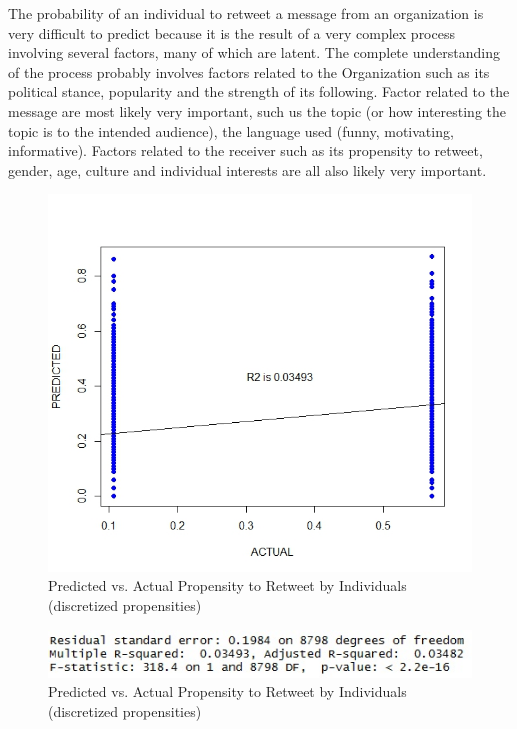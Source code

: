 The probability of an individual to retweet a message from an organization is very difficult to predict because it is the result of a very complex process involving several factors, many of which are latent.  The complete understanding of the process probably involves factors related to the Organization such as its political stance, popularity and the strength of its following.  Factor related to the message are most likely very important, such us the topic (or how interesting the topic is to the intended audience), the language used (funny, motivating, informative).  Factors related to the receiver such as its propensity to retweet, gender, age, culture and individual interests are all also likely very important.  
\begin{figure}
\includegraphics[scale=0.4]{PredictedvActual_binning}
\caption{Predicted vs. Actual Propensity to Retweet by Individuals (discretized propensities)}
\end{figure}
\begin{figure}
\includegraphics[scale=0.7]{R2_results_binning}
\caption{Predicted vs. Actual Propensity to Retweet by Individuals (discretized propensities)}
\end{figure}
